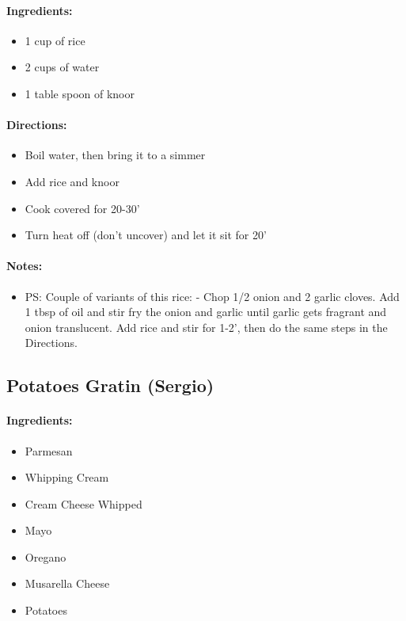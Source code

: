 \documentclass{article}
\begin{document}
\paragraph{Ingredients:}

\begin{itemize}
	\item 1 cup of rice
	\item 2 cups of water
	\item 1 table spoon of knoor
\end{itemize}

\paragraph{Directions:}
\begin{itemize}
	\item Boil water, then bring it to a simmer
	\item Add rice and knoor
	\item Cook covered for 20-30'
	\item Turn heat off (don't uncover) and let it sit for 20'
\end{itemize} 

\paragraph{Notes:}
\begin{itemize}
	\item PS: Couple of variants of this rice: - Chop 1/2 onion and 2 garlic cloves. Add 1 tbsp of oil and stir fry the onion and garlic until garlic gets fragrant and onion translucent. Add rice and stir for 1-2’, then do the same steps in the Directions.
\end{itemize}

\subsection{Potatoes Gratin (Sergio)}

\paragraph{Ingredients:}

\begin{itemize}
	\item Parmesan
	\item Whipping Cream
	\item Cream Cheese Whipped
	\item Mayo
	\item Oregano
	\item Musarella Cheese
	\item Potatoes
\end{itemize}
\end{document}
